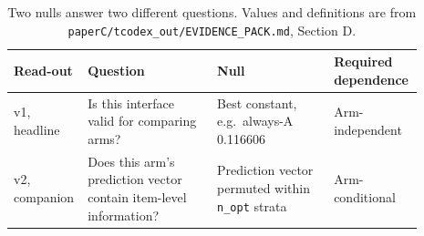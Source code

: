 \begin{table}[t]
\centering
\small
\setlength{\tabcolsep}{4pt}
\begin{tabular}{p{0.12\linewidth}p{0.31\linewidth}p{0.29\linewidth}p{0.17\linewidth}}
\toprule
Read-out & Question & Null & Required dependence \\
\midrule
v1, headline & Is this interface valid for comparing arms? & Best constant, e.g.\ always-A 0.116606 & Arm-independent \\
v2, companion & Does this arm's prediction vector contain item-level information? & Prediction vector permuted within \texttt{n\_opt} strata & Arm-conditional \\
\bottomrule
\end{tabular}
\caption{Two nulls answer two different questions. Values and definitions are from \texttt{paperC/tcodex\_out/EVIDENCE\_PACK.md}, Section D.}
\label{tab:two-nulls}
\end{table}
